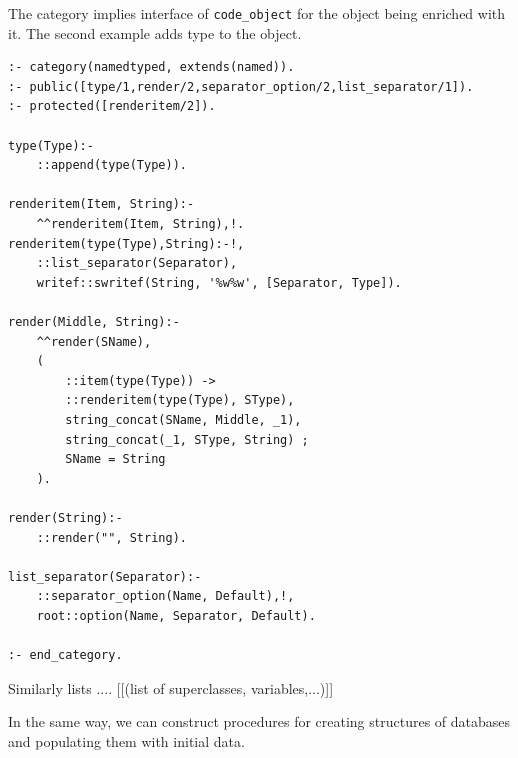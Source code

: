 \documentclass[12pt,a4paper]{llncs}
\begin{document}
The category implies interface of \texttt{code\_object} for the object being enriched with it.  The second example adds type to the object.

\begin{verbatim}
:- category(namedtyped, extends(named)).
:- public([type/1,render/2,separator_option/2,list_separator/1]).
:- protected([renderitem/2]).

type(Type):-
    ::append(type(Type)).

renderitem(Item, String):-
    ^^renderitem(Item, String),!.
renderitem(type(Type),String):-!,
    ::list_separator(Separator),
    writef::swritef(String, '%w%w', [Separator, Type]).

render(Middle, String):-
    ^^render(SName),
    (
        ::item(type(Type)) ->
        ::renderitem(type(Type), SType),
        string_concat(SName, Middle, _1),
        string_concat(_1, SType, String) ;
        SName = String
    ).

render(String):-
    ::render("", String).

list_separator(Separator):-
    ::separator_option(Name, Default),!,
    root::option(Name, Separator, Default).

:- end_category.
\end{verbatim}

Similarly lists .... [[(list of superclasses, variables,...)]]

In the same way, we can construct procedures for creating structures of databases and populating them with initial data.


\end{document}
